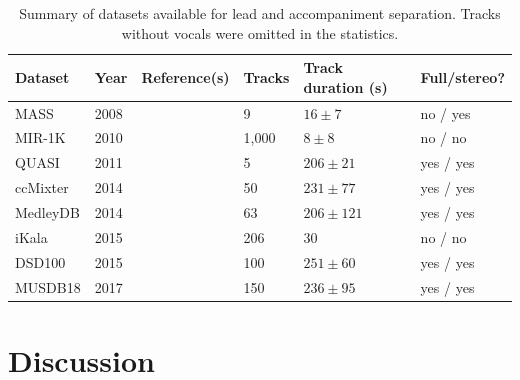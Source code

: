 \begin{table}[htbp]
	\centering
	\caption{Summary of datasets available for lead and accompaniment separation. Tracks without vocals were omitted in the statistics.}
	\label{tab:datasets}
		\begin{tabular}{l l l l l l}
			\hline
			\textbf{Dataset} & \textbf{Year} & \textbf{Reference(s)} & \textbf{Tracks} & \textbf{Track duration (s)} & \textbf{Full/stereo?}\\
			\hline
			MASS & 2008 & \cite{MTGMASSdb} & 9 & $16 \pm 7$ & no / yes \\
			MIR-1K & 2010 & \cite{hsu10} & 1,000 & $8 \pm 8$ & no / no \\
			QUASI & 2011 & \cite{liutkus11,vincent12} & 5 & $206 \pm 21$ & yes / yes \\
			ccMixter & 2014 & \cite{liutkus142} & 50 & $231 \pm 77 $ & yes / yes \\
			MedleyDB & 2014 & \cite{bittner14} & 63 & $206 \pm 121$ & yes / yes \\
			iKala & 2015 & \cite{chan15} & 206 & 30 & no / no \\
			DSD100 & 2015 & \cite{ono15} & 100 & $251 \pm 60$ & yes / yes \\
      MUSDB18 & 2017 & \cite{rafii17} & 150 & $236 \pm 95$ & yes / yes \\
			\hline
		\end{tabular}
\end{table}


\section{Discussion}

